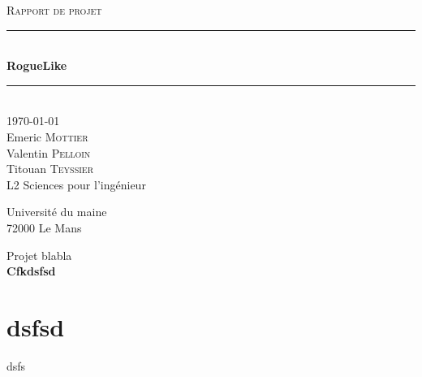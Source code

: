 \documentclass[12pt]{article}
\begin{document}
\begin{titlepage}
	
	\newcommand{\HRule}{\rule{\linewidth}{0.5mm}}
	\center
	
	\textsc{\LARGE Rapport de projet}\\[1.5cm]
	
	\HRule \\[0.4cm]
	{ \huge \bfseries RogueLike}\\[0.4cm]
	\HRule \\[1.5cm]
	 
	{\large \today}\\[1cm]
	

	Emeric \textsc{Mottier}\\
	Valentin \textsc{Pelloin}\\
	Titouan \textsc{Teyssier}\\
	L2 Sciences pour l'ingénieur
	
	Université du maine\\
	72000 Le Mans

	\large Projet blabla\\[0.5cm]
	
	
	{ \large \bfseries Cfkdsfsd}\\[0.4cm]
	
	\vfill
\end{titlepage}

\section{dsfsd}

dsfs
\end{document}
